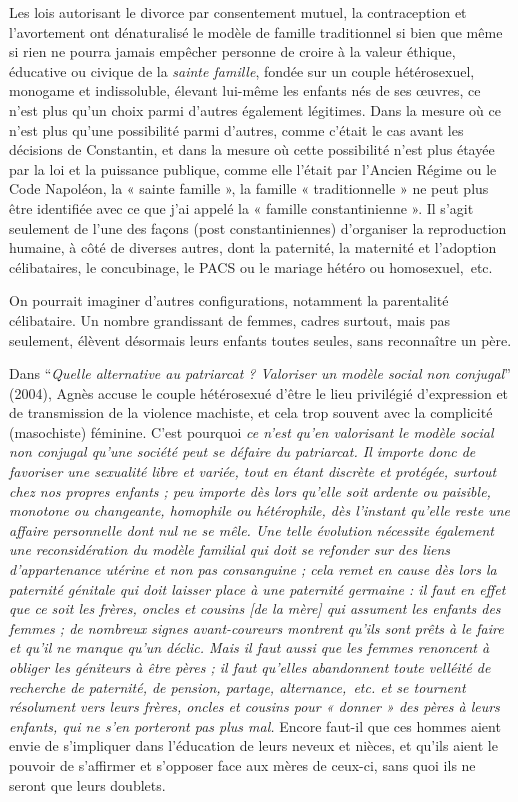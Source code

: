 Les lois autorisant le divorce par consentement mutuel, la contraception et l'avortement ont dénaturalisé le modèle de famille traditionnel si bien que même si rien ne pourra jamais empêcher personne de croire à la valeur éthique, éducative ou civique de la {\emph{sainte famille}}, fondée sur un couple hétérosexuel, monogame et indissoluble, élevant lui-même les enfants nés de ses œuvres, ce n'est plus qu'un choix parmi d'autres également légitimes. Dans la mesure où ce n'est plus qu'une possibilité parmi d'autres, comme c'était le cas avant les décisions de Constantin, et dans la mesure où cette possibilité n'est plus étayée par la loi et la puissance publique, comme elle l'était par l'Ancien Régime ou le Code Napoléon, la « sainte famille », la famille « traditionnelle » ne peut plus être identifiée avec ce que j'ai appelé la « famille constantinienne ». Il s'agit seulement de l'une des façons (post constantiniennes) d'organiser la reproduction humaine, à côté de diverses autres, dont la paternité, la maternité et l'adoption célibataires, le concubinage, le PACS ou le mariage hétéro ou homosexuel,~etc.

On pourrait imaginer d'autres configurations, notamment la parentalité célibataire. Un nombre grandissant de femmes, cadres surtout, mais pas seulement, élèvent désormais leurs enfants toutes seules, sans reconnaître un père. 

Dans \enquote{\emph{Quelle alternative au patriarcat ? Valoriser un modèle social non conjugal}} (2004), Agnès  accuse le couple hétérosexué d'être le lieu privilégié d'expression et de transmission de la violence machiste, et cela trop souvent avec la complicité (masochiste) féminine. C'est pourquoi {\emph{ce n'est qu'en valorisant le modèle social non conjugal qu'une société peut se défaire du patriarcat. Il importe donc de favoriser une sexualité libre et variée, tout en étant discrète et protégée, surtout chez nos propres enfants ; peu importe dès lors qu'elle soit ardente ou paisible, monotone ou changeante, homophile ou hétérophile, dès l'instant qu'elle reste une affaire personnelle dont nul ne se mêle. Une telle évolution nécessite également une reconsidération du modèle familial qui doit se refonder sur des liens d'appartenance utérine et non pas consanguine ; cela remet en cause dès lors la paternité génitale qui doit laisser place à une paternité germaine : il faut en effet que ce soit les frères, oncles et cousins \emph{[de la mère]} qui assument les enfants des femmes ; de nombreux signes avant-coureurs montrent qu'ils sont prêts à le faire et qu'il ne manque qu'un déclic. Mais il faut aussi que les femmes renoncent à obliger les géniteurs à être pères ; il faut qu'elles abandonnent toute velléité de recherche de paternité, de pension, partage, alternance,~etc. et se tournent résolument vers leurs frères, oncles et cousins pour « donner » des pères à leurs enfants, qui ne s'en porteront pas plus mal.}} Encore faut-il que ces hommes aient envie de s'impliquer dans l'éducation de leurs neveux et nièces, et qu'ils aient le pouvoir de s'affirmer et s'opposer face aux mères de ceux-ci, sans quoi ils ne seront que leurs doublets. 
 
